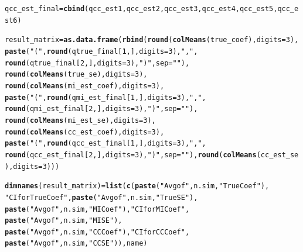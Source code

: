 \documentclass[fleqn,10pt]{wlscirep}\usepackage[]{graphicx}\usepackage[]{color}
\makeatletter
\newcommand{\hlnum}[1]{\textcolor[rgb]{0.686,0.059,0.569}{#1}}%
\newcommand{\hlstr}[1]{\textcolor[rgb]{0.192,0.494,0.8}{#1}}%
\newcommand{\hlstd}[1]{\textcolor[rgb]{0.345,0.345,0.345}{#1}}%
\newcommand{\hlkwb}[1]{\textcolor[rgb]{0.69,0.353,0.396}{#1}}%
\newcommand{\hlkwc}[1]{\textcolor[rgb]{0.333,0.667,0.333}{#1}}%
\newcommand{\hlkwd}[1]{\textcolor[rgb]{0.737,0.353,0.396}{\textbf{#1}}}%
\newenvironment{kframe}{%
 \def\at@end@of@kframe{}%
 \ifinner\ifhmode%
  \def\at@end@of@kframe{\end{minipage}}%
  \begin{minipage}{\columnwidth}%
 \fi\fi%
 \def\FrameCommand##1{\hskip\@totalleftmargin \hskip-\fboxsep
 \colorbox{shadecolor}{##1}\hskip-\fboxsep
     \hskip-\linewidth \hskip-\@totalleftmargin \hskip\columnwidth}%
 \MakeFramed {\advance\hsize-\width
   \@totalleftmargin\z@ \linewidth\hsize
   \@setminipage}}%
 {\par\unskip\endMakeFramed%
 \at@end@of@kframe}
\newenvironment{knitrout}{}{} %
\makeatother
\begin{document}
\begin{knitrout}
\begin{kframe}
\begin{alltt}
  \hlstd{qcc_est_final} \hlkwb{=} \hlkwd{cbind}\hlstd{(qcc_est1, qcc_est2, qcc_est3, qcc_est4, qcc_est5, qcc_est6)}


  \hlstd{result_matrix} \hlkwb{=} \hlkwd{as.data.frame}\hlstd{(}\hlkwd{rbind}\hlstd{(}\hlkwd{round}\hlstd{(}\hlkwd{colMeans}\hlstd{(true_coef),} \hlkwc{digits} \hlstd{=} \hlnum{3}\hlstd{),}
                                      \hlkwd{paste}\hlstd{(}\hlstr{"("}\hlstd{,}\hlkwd{round}\hlstd{(qtrue_final[}\hlnum{1}\hlstd{,],} \hlkwc{digits} \hlstd{=} \hlnum{3}\hlstd{),}\hlstr{","}\hlstd{,}
                                       \hlkwd{round}\hlstd{(qtrue_final[}\hlnum{2}\hlstd{,],} \hlkwc{digits} \hlstd{=} \hlnum{3}\hlstd{),}\hlstr{")"}\hlstd{,} \hlkwc{sep} \hlstd{=} \hlstr{""}\hlstd{),}
                                       \hlkwd{round}\hlstd{(}\hlkwd{colMeans}\hlstd{(true_se),} \hlkwc{digits} \hlstd{=} \hlnum{3}\hlstd{),}
                                       \hlkwd{round}\hlstd{(}\hlkwd{colMeans}\hlstd{(mi_est_coef),} \hlkwc{digits} \hlstd{=} \hlnum{3}\hlstd{),}
                                      \hlkwd{paste}\hlstd{(}\hlstr{"("}\hlstd{,}\hlkwd{round}\hlstd{(qmi_est_final[}\hlnum{1}\hlstd{,],} \hlkwc{digits} \hlstd{=} \hlnum{3}\hlstd{),}\hlstr{","}\hlstd{,}
                                       \hlkwd{round}\hlstd{(qmi_est_final[}\hlnum{2}\hlstd{,],} \hlkwc{digits} \hlstd{=} \hlnum{3}\hlstd{),}\hlstr{")"}\hlstd{,} \hlkwc{sep} \hlstd{=} \hlstr{""}\hlstd{),}
                                       \hlkwd{round}\hlstd{(}\hlkwd{colMeans}\hlstd{(mi_est_se),} \hlkwc{digits} \hlstd{=} \hlnum{3}\hlstd{),}
                                       \hlkwd{round}\hlstd{(}\hlkwd{colMeans}\hlstd{(cc_est_coef),} \hlkwc{digits} \hlstd{=} \hlnum{3}\hlstd{),}
                                      \hlkwd{paste}\hlstd{(}\hlstr{"("}\hlstd{,}\hlkwd{round}\hlstd{(qcc_est_final[}\hlnum{1}\hlstd{,],} \hlkwc{digits} \hlstd{=} \hlnum{3}\hlstd{),}\hlstr{","}\hlstd{,}
                                       \hlkwd{round}\hlstd{(qcc_est_final[}\hlnum{2}\hlstd{,],} \hlkwc{digits} \hlstd{=} \hlnum{3}\hlstd{),}\hlstr{")"}\hlstd{,} \hlkwc{sep} \hlstd{=} \hlstr{""}\hlstd{),}                                       \hlkwd{round}\hlstd{(}\hlkwd{colMeans}\hlstd{(cc_est_se),} \hlkwc{digits} \hlstd{=} \hlnum{3}\hlstd{)))}

  \hlkwd{dimnames}\hlstd{(result_matrix)} \hlkwb{=} \hlkwd{list}\hlstd{(}\hlkwd{c}\hlstd{(}\hlkwd{paste}\hlstd{(}\hlstr{"Avg of"}\hlstd{, n.sim,} \hlstr{"True Coef"}\hlstd{),}
                                   \hlstr{"CI for True Coef"}\hlstd{,} \hlkwd{paste}\hlstd{(}\hlstr{"Avg of"}\hlstd{, n.sim,} \hlstr{"True SE"}\hlstd{),}
                                   \hlkwd{paste}\hlstd{(}\hlstr{"Avg of"}\hlstd{, n.sim,} \hlstr{"MI Coef"}\hlstd{),} \hlstr{"CI for MI Coef"}\hlstd{,}
                                   \hlkwd{paste}\hlstd{(}\hlstr{"Avg of"}\hlstd{, n.sim,} \hlstr{"MI SE"}\hlstd{),}
                                   \hlkwd{paste}\hlstd{(}\hlstr{"Avg of"}\hlstd{, n.sim,} \hlstr{"CC Coef"}\hlstd{),} \hlstr{"CI for CC Coef"}\hlstd{,}
                                   \hlkwd{paste}\hlstd{(}\hlstr{"Avg of"}\hlstd{, n.sim,} \hlstr{"CC SE"}\hlstd{)), name)}


\end{alltt}
\end{kframe}
\end{knitrout}
\end{document}
